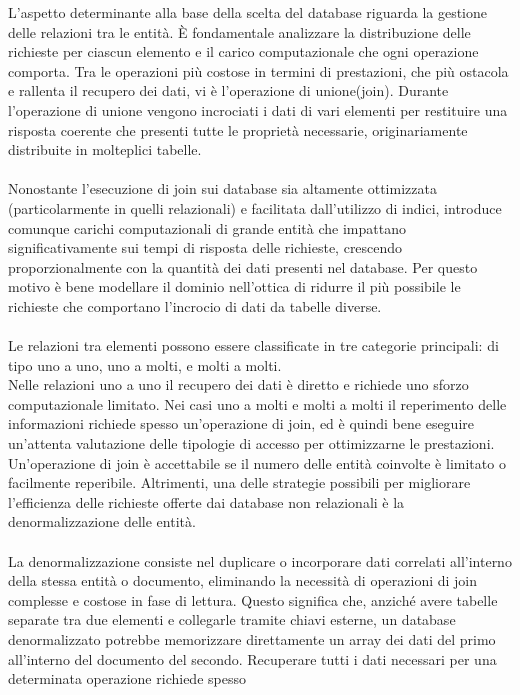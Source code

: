 L'aspetto determinante alla base della scelta del database
riguarda la gestione delle relazioni tra le entità.
È fondamentale analizzare la distribuzione delle richieste per ciascun elemento
e il carico computazionale che ogni operazione comporta.
Tra le operazioni più costose in termini di prestazioni,
che più ostacola e rallenta il recupero dei dati, vi è l'operazione di unione(join).
Durante l'operazione di unione vengono incrociati i dati di vari elementi
per restituire una risposta coerente che presenti tutte le proprietà necessarie,
originariamente distribuite in molteplici tabelle. \\
\\
Nonostante l'esecuzione di join sui database sia altamente ottimizzata
(particolarmente in quelli relazionali) e facilitata dall'utilizzo di indici,
introduce comunque carichi computazionali di grande entità che impattano
significativamente sui tempi di risposta delle richieste,
crescendo proporzionalmente con la quantità dei dati presenti nel database.
Per questo motivo è bene modellare il dominio nell'ottica di ridurre il più possibile
le richieste che comportano l'incrocio di dati da tabelle diverse.\\
\\
Le relazioni tra elementi possono essere classificate in tre categorie principali:
di tipo uno a uno, uno a molti, e molti a molti. \\
Nelle relazioni uno a uno il recupero dei dati è diretto
e richiede uno sforzo computazionale limitato.
Nei casi uno a molti e molti a molti il reperimento delle informazioni richiede
spesso un'operazione di join, ed è quindi bene eseguire un'attenta valutazione
delle tipologie di accesso per ottimizzarne le prestazioni.
Un'operazione di join è accettabile se il numero delle entità coinvolte è limitato o facilmente reperibile.
Altrimenti, una delle strategie possibili per migliorare l'efficienza delle richieste
offerte dai database non relazionali è la denormalizzazione delle entità.\\
\\
La denormalizzazione consiste nel duplicare o incorporare dati correlati all'interno della stessa entità o documento,
eliminando la necessità di operazioni di join complesse e costose in fase di lettura.
Questo significa che, 
anziché avere tabelle separate tra due elementi e collegarle tramite chiavi esterne,
un database denormalizzato potrebbe memorizzare direttamente
un array dei dati del primo all'interno del documento del secondo.
Recuperare tutti i dati necessari per una determinata operazione richiede spesso
